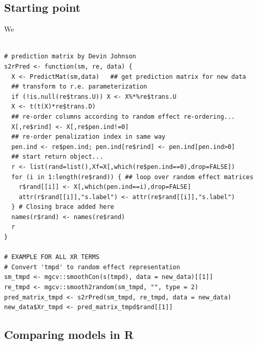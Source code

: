 \subsection{Starting point}
We 
\begin{verbatim}
    
# prediction matrix by Devin Johnson
s2rPred <- function(sm, re, data) {
  X <- PredictMat(sm,data)   ## get prediction matrix for new data
  ## transform to r.e. parameterization
  if (!is.null(re$trans.U)) X <- X%*%re$trans.U
  X <- t(t(X)*re$trans.D)
  ## re-order columns according to random effect re-ordering...
  X[,re$rind] <- X[,re$pen.ind!=0] 
  ## re-order penalization index in same way  
  pen.ind <- re$pen.ind; pen.ind[re$rind] <- pen.ind[pen.ind>0]
  ## start return object...
  r <- list(rand=list(),Xf=X[,which(re$pen.ind==0),drop=FALSE])
  for (i in 1:length(re$rand)) { ## loop over random effect matrices
    r$rand[[i]] <- X[,which(pen.ind==i),drop=FALSE]
    attr(r$rand[[i]],"s.label") <- attr(re$rand[[i]],"s.label")
  } # Closing brace added here
  names(r$rand) <- names(re$rand)
  r
}

# EXAMPLE FOR ALL XR TERMS
# Convert 'tmpd' to random effect representation
sm_tmpd <- mgcv::smoothCon(s(tmpd), data = new_data)[[1]]
re_tmpd <- mgcv::smooth2random(sm_tmpd, "", type = 2)
pred_matrix_tmpd <- s2rPred(sm_tmpd, re_tmpd, data = new_data)
new_data$Xr_tmpd <- pred_matrix_tmpd$rand[[1]]

\end{verbatim}


\subsection{Comparing models in R}


